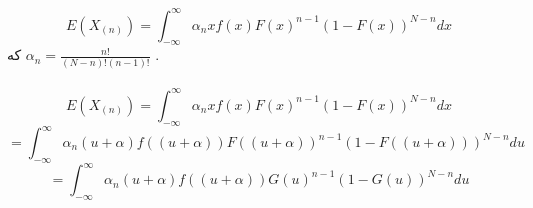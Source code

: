\parte{}
\[
    E(X_{(n)}) = \int_{-\infty}^{\infty}
    {\alpha_n x f(x)F(x)^{n-1}(1-F(x))^{N-n}}dx
\]
که $\alpha_n = \frac{n!}{(N-n)!(n-1)!}$
.\\\\
\parte{}
\[
    E(X_{(n)}) = \int_{-\infty}^{\infty}
    {\alpha_n x f(x)F(x)^{n-1}(1-F(x))^{N-n}}dx
\]
\[
    = \int_{-\infty}^{\infty}
    {\alpha_n (u+\alpha) f((u+\alpha))F((u+\alpha))^{n-1}(1-F((u+\alpha)))^{N-n}}du
\]
\[
    = \int_{-\infty}^{\infty}
    {\alpha_n (u+\alpha) f((u+\alpha))G(u)^{n-1}(1-G(u))^{N-n}}du
\]